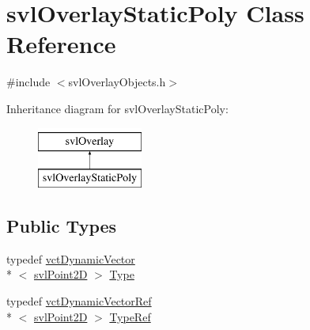 \hypertarget{classsvl_overlay_static_poly}{\section{svl\-Overlay\-Static\-Poly Class Reference}
\label{classsvl_overlay_static_poly}
}


{\ttfamily \#include $<$svl\-Overlay\-Objects.\-h$>$}

Inheritance diagram for svl\-Overlay\-Static\-Poly\-:\begin{figure}[H]
\begin{center}
\leavevmode
\includegraphics[height=2.000000cm]{d4/da0/classsvl_overlay_static_poly}
\end{center}
\end{figure}
\subsection*{Public Types}
\begin{DoxyCompactItemize}
\item 
typedef \hyperlink{classvct_dynamic_vector}{vct\-Dynamic\-Vector}\\*
$<$ \hyperlink{structsvl_point2_d}{svl\-Point2\-D} $>$ \hyperlink{classsvl_overlay_static_poly_a0c7018bd6af72d2fba86b58f1d966291}{Type}
\item 
typedef \hyperlink{classvct_dynamic_vector_ref}{vct\-Dynamic\-Vector\-Ref}\\*
$<$ \hyperlink{structsvl_point2_d}{svl\-Point2\-D} $>$ \hyperlink{classsvl_overlay_static_poly_a2d317856c0cec72b3a76252446a85944}{Type\-Ref}
\end{DoxyCompactItemize}
